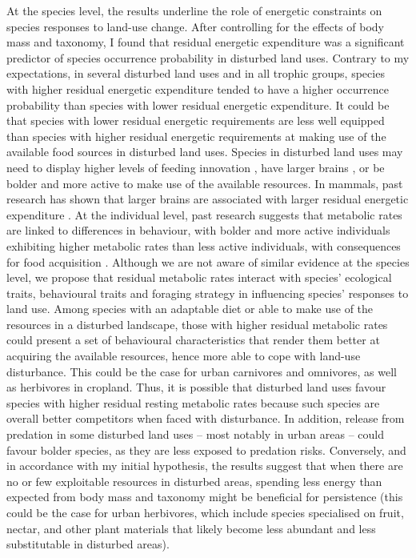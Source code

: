 At the species level, the results underline the role of energetic constraints on species responses to land-use change. After controlling for the effects of body mass and taxonomy, I found that residual energetic expenditure was a significant predictor of species occurrence probability in disturbed land uses. Contrary to my expectations, in several disturbed land uses and in all trophic groups, species with higher residual energetic expenditure tended to have a higher occurrence probability than species with lower residual energetic expenditure. It could be that species with lower residual energetic requirements are less well equipped than species with higher residual energetic requirements at making use of the available food sources in disturbed land uses. Species in disturbed land uses may need to display higher levels of feeding innovation \citep{Coogan2018}, have larger brains \citep{Sayol2020}, or be bolder and more active to make use of the available resources. In mammals, past research has shown that larger brains are associated with larger residual energetic expenditure \citep{Isler2006}. At the individual level, past research suggests that metabolic rates are linked to differences in behaviour, with bolder and more active individuals exhibiting higher metabolic rates than less active individuals, with consequences for food acquisition \citep{Biro2010}. Although we are not aware of similar evidence at the species level, we propose that residual metabolic rates interact with species’ ecological traits, behavioural traits and foraging strategy in influencing species’ responses to land use. Among species with an adaptable diet or able to make use of the resources in a disturbed landscape, those with higher residual metabolic rates could present a set of behavioural characteristics that render them better at acquiring the available resources, hence more able to cope with land-use disturbance. This could be the case for urban carnivores and omnivores, as well as herbivores in cropland. Thus, it is possible that disturbed land uses favour species with higher residual resting metabolic rates because such species are overall better competitors when faced with disturbance. In addition, release from predation in some disturbed land uses – most notably in urban areas – could favour bolder species, as they are less exposed to predation risks. Conversely, and in accordance with my initial hypothesis, the results suggest that when there are no or few exploitable resources in disturbed areas, spending less energy than expected from body mass and taxonomy might be beneficial for persistence (this could be the case for urban herbivores, which include species specialised on fruit, nectar, and other plant materials that likely become less abundant and less substitutable in disturbed areas).

